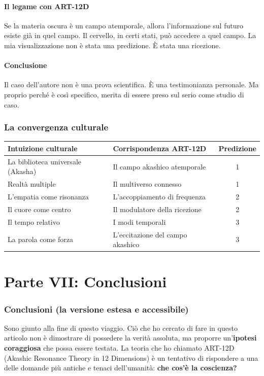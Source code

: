 \documentclass[11pt,a4paper]{article}
\begin{document}
\subsection{Il legame con ART-12D}
Se la materia oscura è un campo atemporale, allora l'informazione sul futuro esiste già in quel campo. Il cervello, in certi stati, può accedere a quel campo. La mia visualizzazione non è stata una predizione. È stata una ricezione.

\subsection{Conclusione}
Il caso dell'autore non è una prova scientifica. È una testimonianza personale. Ma proprio perché è così specifico, merita di essere preso sul serio come studio di caso.

\section{La convergenza culturale}
\begin{table}[H]
\centering
\begin{tabular}{@{}llc@{}}
\toprule
\textbf{Intuizione culturale} & \textbf{Corrispondenza ART-12D} & \textbf{Predizione} \\ \midrule
La biblioteca universale (Akasha) & Il campo akashico atemporale & 1 \\
Realtà multiple & Il multiverso connesso & 1 \\
L'empatia come risonanza & L'accoppiamento di frequenza & 2 \\
Il cuore come centro & Il modulatore della ricezione & 2 \\
Il tempo relativo & I modi temporali & 3 \\
La parola come forza & L'eccitazione del campo akashico & 3 \\ \bottomrule
\end{tabular}
\end{table}

\newpage
\part*{Parte VII: Conclusioni}

\section{Conclusioni (la versione estesa e accessibile)}
Sono giunto alla fine di questo viaggio. Ciò che ho cercato di fare in questo articolo non è dimostrare di possedere la verità assoluta, ma proporre un'\textbf{ipotesi coraggiosa} che possa essere testata. La teoria che ho chiamato ART-12D (Akashic Resonance Theory in 12 Dimensions) è un tentativo di rispondere a una delle domande più antiche e tenaci dell'umanità: \textbf{che cos'è la coscienza?}
\end{document}
